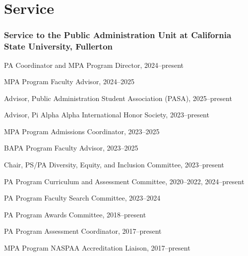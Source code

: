 \documentclass[12pt,letterpaper]{article}
\renewenvironment{itemize}{
  \begin{list}{}{
    \setlength{\leftmargin}{1.5em}
    \setlength{\itemsep}{0.25em}
    \setlength{\parskip}{0pt}
    \setlength{\parsep}{0.25em}
  }
}{
  \end{list}
}
\begin{document}
\section*{Service}

\subsubsection*{Service to the Public Administration Unit at California State University, Fullerton}
\begin{itemize}\leftmargin=2pt\itemindent=-15pt
    \item PA Coordinator and MPA Program Director, 2024--present
    \item MPA Program Faculty Advisor, 2024--2025
    \item Advisor, Public Administration Student Association (PASA), 2025--present
    \item Advisor, Pi Alpha Alpha International Honor Society, 2023--present
    \item MPA Program Admissions Coordinator, 2023--2025
    \item BAPA Program Faculty Advisor, 2023--2025
    \item Chair, PS/PA Diversity, Equity, and Inclusion Committee, 2023--present
    \item PA Program Curriculum and Assessment Committee, 2020--2022, 2024--present
    \item PA Program Faculty Search Committee, 2023--2024
    \item PA Program Awards Committee, 2018--present
    \item PA Program Assessment Coordinator, 2017--present
    \item MPA Program NASPAA Accreditation Liaison, 2017--present
\end{itemize}
\end{document}
